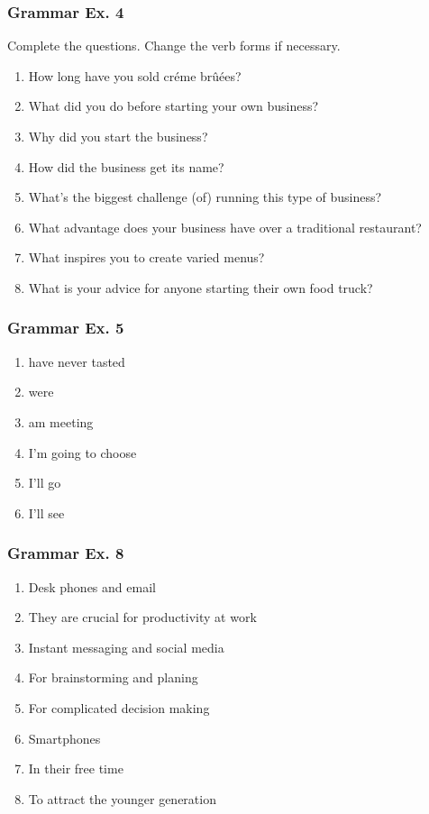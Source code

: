 \documentclass[12pt, a4paper, oneside]{article}
\begin{document}
  \subsubsection{Grammar Ex.  4}
  Complete the questions. Change the verb forms if necessary.

  \begin{enumerate}[1.]
    \item How long have you sold créme brûées?
    \item What did you do before starting your own business?
    \item Why did you start the business?
    \item How did the business get its name?
    \item What's the biggest challenge (of) running this type of business?
    \item What advantage does your business have over a traditional restaurant?
    \item What inspires you to create varied menus?
    \item What is your advice for anyone starting their own food truck?
  \end{enumerate}

  \subsubsection{Grammar Ex. 5}
  \begin{enumerate}[1.]
    \item have never tasted
    \item were
    \item am meeting
    \item I'm going to choose
    \item I'll go
    \item I'll see
  \end{enumerate}

  \subsubsection{Grammar Ex. 8}
  \begin{enumerate}[1.]
    \item Desk phones and email
    \item They are crucial for productivity at work
    \item Instant messaging and social media
    \item For brainstorming and planing
    \item For complicated decision making
    \item Smartphones
    \item In their free time
    \item To attract the younger generation
  \end{enumerate}
\end{document}
